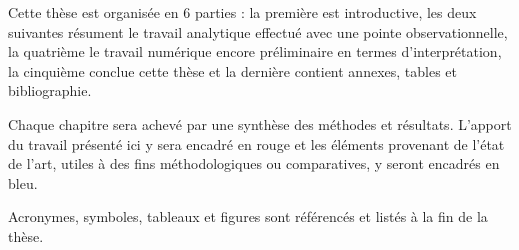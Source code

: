 

Cette thèse est organisée en $\num{6}$ parties : la première est introductive, les deux suivantes résument le travail analytique effectué avec une pointe observationnelle, la quatrième le travail numérique encore préliminaire en termes d'interprétation, la cinquième conclue cette thèse et la dernière contient annexes, tables et bibliographie.  

Chaque chapitre sera achevé par une synthèse des méthodes et résultats. L'apport du travail présenté ici y sera encadré en rouge et les éléments provenant de l'état de l'art, utiles à des fins méthodologiques ou comparatives, y seront encadrés en bleu.   

Acronymes, symboles, tableaux et figures sont référencés et listés à la fin de la thèse. 
